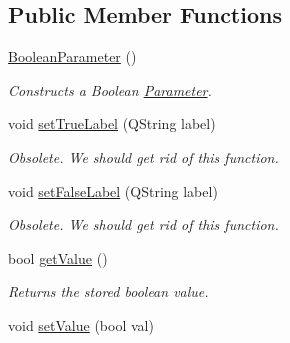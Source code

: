\subsection*{Public Member Functions}
\begin{DoxyCompactItemize}
\item 
\hyperlink{class_picto_1_1_boolean_parameter_a369df31a7570a4c8e45cb41d2322a3be}{Boolean\-Parameter} ()
\begin{DoxyCompactList}\small\item\em Constructs a Boolean \hyperlink{class_picto_1_1_parameter}{Parameter}. \end{DoxyCompactList}\item 
\hypertarget{class_picto_1_1_boolean_parameter_a081441c216147c3cca681a58ac84fcb1}{void \hyperlink{class_picto_1_1_boolean_parameter_a081441c216147c3cca681a58ac84fcb1}{set\-True\-Label} (Q\-String label)}\label{class_picto_1_1_boolean_parameter_a081441c216147c3cca681a58ac84fcb1}

\begin{DoxyCompactList}\small\item\em Obsolete. We should get rid of this function. \end{DoxyCompactList}\item 
\hypertarget{class_picto_1_1_boolean_parameter_af0e17c1b3f3b14fe3014c5613a4e215f}{void \hyperlink{class_picto_1_1_boolean_parameter_af0e17c1b3f3b14fe3014c5613a4e215f}{set\-False\-Label} (Q\-String label)}\label{class_picto_1_1_boolean_parameter_af0e17c1b3f3b14fe3014c5613a4e215f}

\begin{DoxyCompactList}\small\item\em Obsolete. We should get rid of this function. \end{DoxyCompactList}\item 
\hypertarget{class_picto_1_1_boolean_parameter_a9d59229c3b265138bd87d79f42a1d291}{bool \hyperlink{class_picto_1_1_boolean_parameter_a9d59229c3b265138bd87d79f42a1d291}{get\-Value} ()}\label{class_picto_1_1_boolean_parameter_a9d59229c3b265138bd87d79f42a1d291}

\begin{DoxyCompactList}\small\item\em Returns the stored boolean value. \end{DoxyCompactList}\item 
\hypertarget{class_picto_1_1_boolean_parameter_aeecc7620a2e788fcfd26b6975daf0dfb}{void \hyperlink{class_picto_1_1_boolean_parameter_aeecc7620a2e788fcfd26b6975daf0dfb}{set\-Value} (bool val)}\label{class_picto_1_1_boolean_parameter_aeecc7620a2e788fcfd26b6975daf0dfb}


\end{DoxyCompactItemize}

